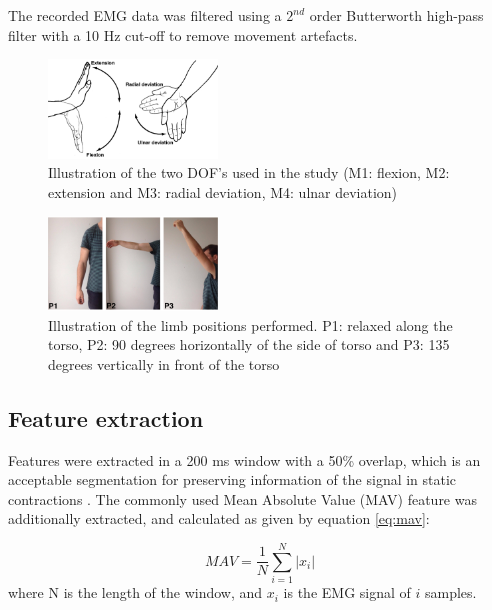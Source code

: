 \begin{multicols}{2}
The recorded EMG data was filtered using a $2^{nd}$ order Butterworth high-pass filter with a 10 Hz cut-off to remove movement artefacts. 

\begin{figure}[H]
	\centering
	\includegraphics[width=0.4\textwidth]{figures/paperFigures/wristmovement}  %
	\caption{Illustration of the two DOF's used in the study (M1: flexion, M2: extension and M3: radial deviation, M4: ulnar deviation)}
	\label{fig:wristmovement}  %
\end{figure}

\begin{figure}[H]
	\centering
	\includegraphics[width=0.4\textwidth]{figures/paperFigures/limb_pos}  %
	\caption{Illustration of the limb positions performed. P1: relaxed along the torso, P2: 90 degrees horizontally of the side of torso and P3: 135 degrees vertically in front of the torso}
	\label{fig:limbpositions}  %
\end{figure}

\subsection{Feature extraction}
Features were extracted in a 200 ms window with a 50\% overlap, which is an acceptable segmentation for preserving information of the signal in static contractions \cite{Farfan2010}.
The commonly used Mean Absolute Value (MAV) feature was additionally extracted, and calculated as given by equation \ref{eq:mav}: \cite{Zecca2002} 

\begin{equation} \label{eq:mav}
MAV = \frac{1}{N}\sum\limits_{i=1}^N|x_i|
\end{equation}
where N is the length of the window, and $x_i$ is the EMG signal of $i$ samples.


\end{multicols}
